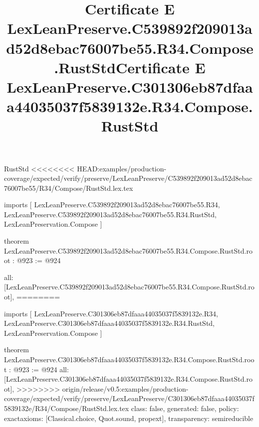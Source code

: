 \begin{lexlean}{RustStd}
<<<<<<<< HEAD:examples/production-coverage/expected/verify/preserve/LexLeanPreserve/C539892f209013ad52d8ebac76007be55/R34/Compose/RustStd.lex.tex
\title{Certificate E LexLeanPreserve.C539892f209013ad52d8ebac76007be55.R34.Compose.RustStd}
\begin{coremodule}
imports [
  LexLeanPreserve.C539892f209013ad52d8ebac76007be55.R34,
  LexLeanPreserve.C539892f209013ad52d8ebac76007be55.R34.RustStd,
  LexLeanPreservation.Compose
]

theorem LexLeanPreserve.C539892f209013ad52d8ebac76007be55.R34.Compose.RustStd.root : @923 := @924 {
  all: [LexLeanPreserve.C539892f209013ad52d8ebac76007be55.R34.Compose.RustStd.root],
========
\title{Certificate E LexLeanPreserve.C301306eb87dfaaa44035037f5839132e.R34.Compose.RustStd}
\begin{coremodule}
imports [
  LexLeanPreserve.C301306eb87dfaaa44035037f5839132e.R34,
  LexLeanPreserve.C301306eb87dfaaa44035037f5839132e.R34.RustStd,
  LexLeanPreservation.Compose
]

theorem LexLeanPreserve.C301306eb87dfaaa44035037f5839132e.R34.Compose.RustStd.root : @923 := @924 {
  all: [LexLeanPreserve.C301306eb87dfaaa44035037f5839132e.R34.Compose.RustStd.root],
>>>>>>>> origin/release/v0.5:examples/production-coverage/expected/verify/preserve/LexLeanPreserve/C301306eb87dfaaa44035037f5839132e/R34/Compose/RustStd.lex.tex
  class: false,
  generated: false,
  policy: exact{axioms: [Classical.choice, Quot.sound, propext]},
  transparency: semireducible
}


\end{coremodule}}
\end{coremodule}
\end{lexlean}
